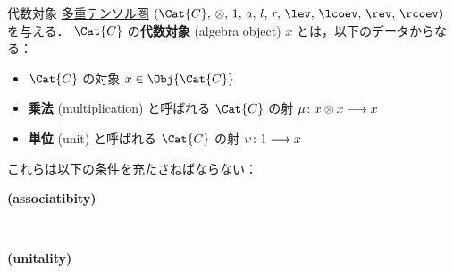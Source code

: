 \documentclass[TQFT_main]{subfiles}
\begin{document}
\begin{mydef}[label=def:algobj,breakable]{代数対象}
    \hyperref[def:tensorfusion-cat]{多重テンソル圏} $(\Cat{C},\, \otimes,\, 1,\, a,\, l,\, r,\, \lev,\, \lcoev,\, \rev,\, \rcoev)$ を与える．
    $ \Cat{C}$ の\textbf{代数対象} (algebra object) $x$ とは，以下のデータからなる：
    \begin{itemize}
        \item $\Cat{C}$ の対象 $x \in \Obj{\Cat{C}}$ 
        \item \textbf{乗法} (multiplication) と呼ばれる $\Cat{C}$ の射 $\mu \colon x \otimes x \longrightarrow x$
        \item \textbf{単位} (unit) と呼ばれる $\Cat{C}$ の射 $\upsilon \colon 1 \longrightarrow x$
    \end{itemize}
    これらは以下の条件を充たさねばならない：
    \begin{description}
        \item[\textbf{(associatibity)}]　
        
        \begin{center}
        \end{center}
    
        \item[\textbf{(unitality)}]　
        
        \begin{center}
        \end{center}
        
        \begin{center}
        \end{center}
    \end{description}
    

\end{mydef}
\end{document}
